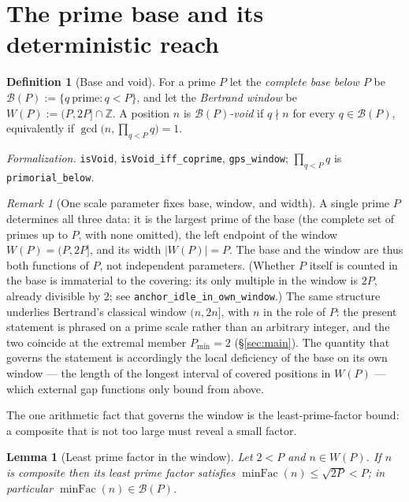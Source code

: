 \documentclass[11pt,a4paper]{amsart}
\theoremstyle{plain}
\newtheorem{lemma}[theorem]{Lemma}
\theoremstyle{definition}
\newtheorem{definition}[theorem]{Definition}
\theoremstyle{plain}
\theoremstyle{remark}
\newtheorem{remark}[theorem]{Remark}
\newcommand{\lean}[1]{\textup{\texttt{#1}}}
\newcommand{\Formal}[1]{\par\smallskip\noindent\emph{Formalization.} #1\par\smallskip}
\begin{document}
\section{The prime base and its deterministic reach}
\label{sec:reach}

\begin{definition}[Base and void]
For a prime $P$ let the \emph{complete base below $P$} be
$\mathcal{B}(P):=\{q\ \text{prime}: q<P\}$, and let the \emph{Bertrand window} be
$W(P):=(P,2P]\cap\mathbb{Z}$. A position $n$ is \emph{$\mathcal{B}(P)$-void} if
$q\nmid n$ for every $q\in\mathcal{B}(P)$, equivalently if
$\gcd\!\big(n,\prod_{q<P}q\big)=1$.
\end{definition}

\Formal{\lean{isVoid}, \lean{isVoid\_iff\_coprime}, \lean{gps\_window};
$\prod_{q<P}q$ is \lean{primorial\_below}.}

\begin{remark}[One scale parameter fixes base, window, and width]\label{rem:triple}
A single prime $P$ determines all three data: it is the largest prime of the base (the complete
set of primes up to $P$, with none omitted), the left endpoint of the window $W(P)=(P,2P]$, and
its width $|W(P)|=P$. The base and the window are thus both functions of $P$, not independent
parameters. (Whether $P$ itself is counted in the base is immaterial to the covering: its only
multiple in the window is $2P$, already divisible by $2$; see
\lean{anchor\_idle\_in\_own\_window}.) The same structure underlies Bertrand's classical window
$(n,2n]$, with $n$ in the role of $P$: the present statement is phrased on a prime scale rather
than an arbitrary integer, and the two coincide at the extremal member $P_{\min}=2$
(\S\ref{sec:main}). The quantity that governs the statement is accordingly the local deficiency
of the base on its own window --- the length of the longest interval of covered positions in
$W(P)$ --- which external gap functions only bound from above.
\end{remark}

The one arithmetic fact that governs the window is the least-prime-factor bound: a
composite that is not too large must reveal a small factor.

\begin{lemma}[Least prime factor in the window]\label{lem:lpf}
Let $2<P$ and $n\in W(P)$. If $n$ is composite then its least prime factor satisfies
$\operatorname{minFac}(n)\le\sqrt{2P}<P$; in particular
$\operatorname{minFac}(n)\in\mathcal{B}(P)$.
\end{lemma}
\end{document}
